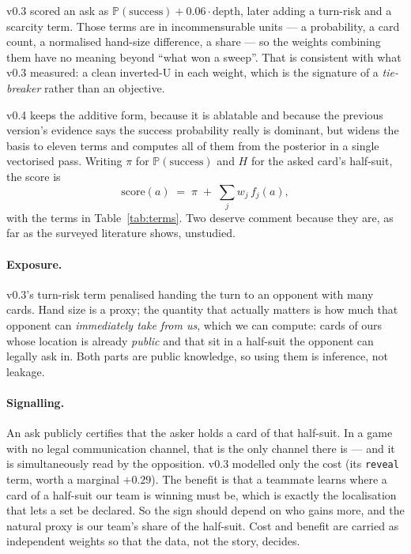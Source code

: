 \documentclass[11pt,a4paper]{article}
\newcommand{\Prob}{\ensuremath{\mathbb{P}}}
\begin{document}
v0.3 scored an ask as $\Prob(\text{success}) + 0.06 \cdot \text{depth}$, later
adding a turn-risk and a scarcity term. Those terms are in incommensurable
units --- a probability, a card count, a normalised hand-size difference, a
share --- so the weights combining them have no meaning beyond ``what won a
sweep''. That is consistent with what v0.3 measured: a clean inverted-U in each
weight, which is the signature of a \emph{tie-breaker} rather than an objective.

v0.4 keeps the additive form, because it is ablatable and because the previous
version's evidence says the success probability really is dominant, but widens
the basis to eleven terms and computes all of them from the posterior in a
single vectorised pass. Writing $\pi$ for $\Prob(\text{success})$ and $H$ for
the asked card's half-suit, the score is
\begin{equation}
\text{score}(a) \;=\; \pi \;+\; \sum_{j} w_j\, f_j(a),
\label{eq:objective}
\end{equation}
with the terms in Table~\ref{tab:terms}. Two deserve comment because they are,
as far as the surveyed literature shows, unstudied.

\paragraph{Exposure.} v0.3's turn-risk term penalised handing the turn to an
opponent with many cards. Hand size is a proxy; the quantity that actually
matters is how much that opponent can \emph{immediately take from us}, which we
can compute: cards of ours whose location is already \emph{public} and that sit
in a half-suit the opponent can legally ask in. Both parts are public knowledge,
so using them is inference, not leakage.

\paragraph{Signalling.} An ask publicly certifies that the asker holds a card of
that half-suit. In a game with no legal communication channel, that is the only
channel there is --- and it is simultaneously read by the opposition. v0.3
modelled only the cost (its \texttt{reveal} term, worth a marginal $+0.29$). The
benefit is that a teammate learns where a card of a half-suit our team is
winning must be, which is exactly the localisation that lets a set be declared.
So the sign should depend on who gains more, and the natural proxy is our team's
share of the half-suit. Cost and benefit are carried as independent weights so
that the data, not the story, decides.
\end{document}

